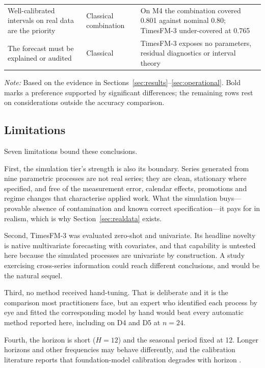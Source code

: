 \documentclass[11pt]{article}
\providecommand{\sectionref}[1]{Section~\ref{#1}}
\begin{document}
\begin{table}[!htbp]
\begin{threeparttable}
\begin{tabular}{>{\raggedright\arraybackslash}p{5.5cm}>{\raggedright\arraybackslash}p{3.0cm}>{\raggedright\arraybackslash}p{5.0cm}}
Well-calibrated intervals on real data are the priority
  & Classical combination
  & On M4 the combination covered 0.801 against nominal 0.80; TimesFM-3 under-covered at
    0.765 \\[2pt]
The forecast must be explained or audited
  & Classical
  & TimesFM-3 exposes no parameters, residual diagnostics or interval theory \\
\bottomrule
\end{tabular}
\begin{tablenotes}[flushleft]\footnotesize
\item \textit{Note:} Based on the evidence in Sections~\ref{sec:results}--\ref{sec:operational}.
Bold marks a preference supported by significant differences; the remaining rows rest on
considerations outside the accuracy comparison.
\end{tablenotes}
\end{threeparttable}
\end{table}

\subsection{Limitations}
\label{sec:limitations}

Seven limitations bound these conclusions.

First, the simulation tier's strength is also its boundary. Series generated from nine
parametric processes are not real series; they are clean, stationary where specified, and free
of the measurement error, calendar effects, promotions and regime changes that characterise
applied work. What the simulation buys---provable absence of contamination and known correct
specification---it pays for in realism, which is why \sectionref{sec:realdata} exists.

Second, TimesFM-3 was evaluated zero-shot and univariate. Its headline novelty is native
multivariate forecasting with covariates, and that capability is untested here because the
simulated processes are univariate by construction. A study exercising cross-series information
could reach different conclusions, and would be the natural sequel.

Third, no method received hand-tuning. That is deliberate and it is the comparison most
practitioners face, but an expert who identified each process by eye and fitted the
corresponding model by hand would beat every automatic method reported here, including on D4
and D5 at $n = 24$.

Fourth, the horizon is short ($H = 12$) and the seasonal period fixed at 12. Longer horizons
and other frequencies may behave differently, and the calibration literature reports that
foundation-model calibration degrades with horizon \citep{adler2026calibrated}.
\end{document}
